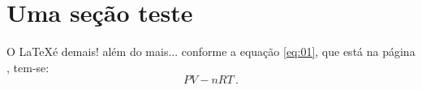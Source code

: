 \documentclass[a4paper,12pt]{article}
\begin{document}
\section{Uma seção teste}
O \LaTeX é demais! além do mais... conforme a equação \ref{eq:01}, que está na página \pageref{eq:01}, tem-se: 
\begin{equation}
PV - nRT\,.
\label{eq:01}
\end{equation}
\end{document}
